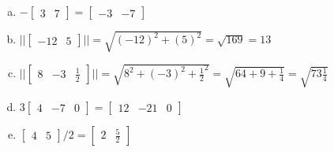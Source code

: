 \documentclass[11pt]{article}
\begin{document}
\begin{enumerate}[a.]
	\item %
$
-\begin{bmatrix}
3 & 7
\end{bmatrix}
=
\begin{bmatrix}
-3 & -7
\end{bmatrix}
$
	\item %
$
||
\begin{bmatrix}
-12 & 5
\end{bmatrix}
|| = 
\sqrt{(-12)^2+(5)^2}=\sqrt{169}=13
$
	\item %
$
||
\begin{bmatrix}
8 & -3 & \frac{1}{2}
\end{bmatrix}
|| = 
\sqrt{8^2+(-3)^2+\frac{1}{2}^2} =
\sqrt{64 + 9 + \frac{1}{4}} = \sqrt{73\frac{1}{4}}
$
	\item %
$
3\begin{bmatrix}
4 & -7 & 0
\end{bmatrix}
=
\begin{bmatrix}
12 & -21 & 0
\end{bmatrix}
$
	\item %
$
\begin{bmatrix}
4 & 5
\end{bmatrix}/2
=
\begin{bmatrix}
2 & \frac{5}{2}
\end{bmatrix}
$
\end{enumerate}
\end{document}
